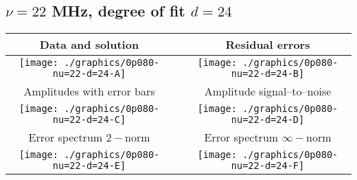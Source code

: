 

% 

\clearpage{}
\break{}

\subsection{$\nu = 22$ MHz, degree of fit $d = 24$}

\begin{table}[h]
    \begin{center}
        \begin{tabular}{ccc}
            Data and solution & \quad & Residual errors \\\hline
            \texttt{[image: ./graphics/0p080-nu=22-d=24-A]} &&
            \texttt{[image: ./graphics/0p080-nu=22-d=24-B]} \\[15pt]
            Amplitudes with error bars && Amplitude signal--to--noise \\\hline
            \texttt{[image: ./graphics/0p080-nu=22-d=24-C]} &&
            \texttt{[image: ./graphics/0p080-nu=22-d=24-D]} \\[15pt]
            Error spectrum $2-$norm && Error spectrum $\infty-$norm \\\hline
            \texttt{[image: ./graphics/0p080-nu=22-d=24-E]} &&
            \texttt{[image: ./graphics/0p080-nu=22-d=24-F]} \\[15pt]
        \end{tabular}
    \end{center}
\label{fig:elev=80, nu=22}
\end{table}



\endinput
